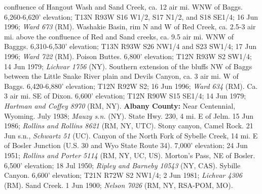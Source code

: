 confluence of Hangout Wash and Sand Creek, ca. 12 air mi. WNW of Baggs. 6,260-6,620’ elevation; T13N R93W S16 W1/2, S17 N1/2, and S18 SE1/4; 16 Jun 1996; \textit{Ward 673} (RM).  Washakie Basin, rim N and W of Red Creek, ca. 2.5-3 air mi. above the confluence of Red and Sand creeks, ca. 9.5 air mi. WNW of Bagggs. 6,310-6,530’ elevation; T13N R93W S26 NW1/4 and S23 SW1/4; 17 Jun 1996; \textit{Ward 722} (RM).  Poison Buttes. 6,800’ elevation; T12N R93W S2 SW1/4; 14 Jun 1979; \textit{Lichvar 1756} (NY).  Southern extension of the bluffs NW of Baggs between the Little Snake River plain and Devils Canyon, ca. 3 air mi. W of Baggs. 6,420-6,880’ elevation; T12N R92W S2; 16 Jun 1996; \textit{Ward 634} (RM).  Ca. 3 air mi. SE of Dixon. 6,600’ elevation; T12N R90W S15 SE1/4; 14 Jun 1979; \textit{Hartman and Coffey 8970} (RM, NY).  \textbf{Albany County:} Near Centennial, Wyoming. July 1938; \textit{Mauzy s.n.} (NY).  State Hwy. 230, 4 mi. E of Jelm. 15 Jun 1986; \textit{Rollins and Rollins 8621} (RM, NY, UTC).  Stony canyon, Camel Rock. 21 Jun s.n., \textit{Schwartz 51} (UC).  Canyon of the North Fork of Sybelle Creek, 14 mi. E of Bosler Junction (U.S. 30 and Wyo State Route 34). 7,000’ elevation; 24 Jun 1951; \textit{Rollins and Porter 5114} (RM, NY, UC, US).  Morton’s Pass, NE of Bosler. 6,500’ elevation; 18 Jul 1950; \textit{Ripley and Barneby 10543} (NY, CAS).  Sybille Canyon. 6,600’ elevation; T21N R72W S2 NW1/4; 2 Jun 1981; \textit{Lichvar 4306} (RM).  Sand Creek. 1 Jun 1900; \textit{Nelson 7026} (RM, NY, RSA-POM, MO).  

